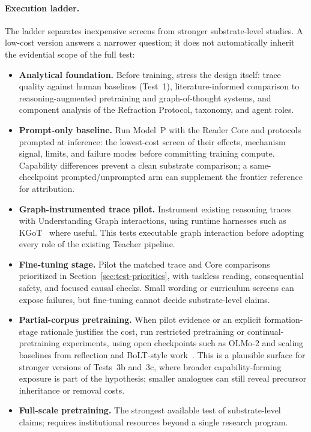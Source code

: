 \documentclass[11pt]{article}
\begin{document}
\paragraph{Execution ladder.} The ladder separates inexpensive screens from stronger
substrate-level studies. A low-cost version answers a narrower question; it
does not automatically inherit the evidential scope of the full test:
\begin{itemize}
    \item \textbf{Analytical foundation.} Before training, stress the design
    itself: trace quality against human baselines (Test~1), literature-informed
    comparison to reasoning-augmented pretraining and graph-of-thought systems,
    and component analysis of the Refraction Protocol, taxonomy, and agent
    roles.
    \item \textbf{Prompt-only baseline.} Run Model~P with the Reader Core and
    protocols prompted at inference: the lowest-cost screen of their effects,
    mechanism signal, limits, and failure modes before committing training
    compute. Capability differences prevent a clean substrate comparison; a
    same-checkpoint prompted/unprompted arm can supplement the frontier
    reference for attribution.
    \item \textbf{Graph-instrumented trace pilot.} Instrument existing
    reasoning traces with Understanding Graph interactions, using runtime
    harnesses such as KGoT~\cite{besta2025kgot} where useful. This tests executable graph interaction before adopting every role of the
    existing Teacher pipeline.
        \item \textbf{Fine-tuning stage.} Pilot the matched trace and Core
    comparisons prioritized in Section~\ref{sec:test-priorities}, with taskless reading, consequential safety,
    and focused causal checks. Small wording or curriculum screens can expose
    failures, but fine-tuning cannot decide substrate-level claims.
    \item \textbf{Partial-corpus pretraining.} When pilot evidence or an
    explicit formation-stage rationale justifies the cost, run restricted
    pretraining or continual-pretraining experiments, using open checkpoints
    such as OLMo-2 and scaling baselines from reflection and
    BoLT-style work~\cite{rethinkingreflection2025,ruan2025bolt}. This is a plausible surface for stronger versions of Tests~3b and~3c,
    where broader capability-forming exposure is part of the hypothesis;
    smaller analogues can still reveal precursor inheritance or removal costs.
    \item \textbf{Full-scale pretraining.} The strongest available test of substrate-level claims; requires institutional resources beyond a single research program.
\end{itemize}
\end{document}
